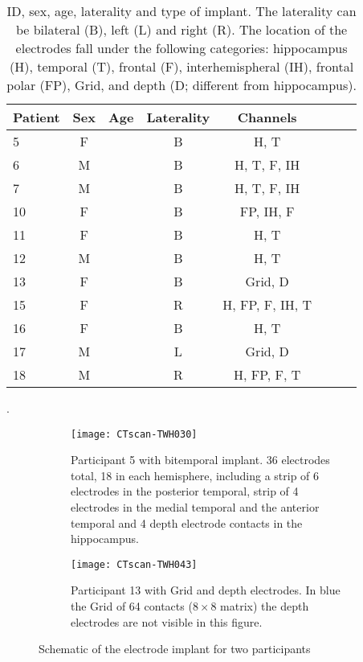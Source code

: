 \documentclass[11pt, onecolumn]{article}
\begin{document}
\begin{table}
\centering
\begin{tabular}{l*{6}{c}r}
Patient & Sex & Age & Laterality & Channels  \\
\hline
5 & F &  & B & H, T \\
6 & M &  & B & H, T, F, IH \\
7 & M &  & B & H, T, F, IH \\
10 & F &  & B & FP, IH, F  \\
11 & F &  & B & H, T \\
12 & M &  & B & H, T  \\ %
13 & F &  & B & Grid, D \\%
15 & F &  & R & H, FP, F, IH, T   \\
16 & F &  & B & H, T  \\
17 & M &  & L & Grid, D \\ %
18 & M &  & R & H, FP, F, T   \\
\end{tabular}
\caption{\label{Table:demog} ID, sex, age, laterality and type of implant. 
The laterality can be bilateral (B), left (L) and right (R). The location of the electrodes fall under the following categories: hippocampus (H), temporal (T), frontal (F),  interhemispheral (IH), frontal  polar (FP),  Grid, and depth  (D; different from hippocampus).}.
\end{table}

\begin{figure}[ht] 
  \begin{subfigure}[t]{0.5\linewidth}
    \centering
    \texttt{[image: CTscan-TWH030]} 
    \caption{Participant 5 with bitemporal implant. 36 electrodes total, 18 in each hemisphere, including a strip of 6 electrodes in the posterior temporal, strip of 4 electrodes in the medial temporal and the anterior temporal and 4 depth electrode contacts in the hippocampus.} 
    \label{fig0:a} 
    \vspace{4ex}
  \end{subfigure}%
  \hspace{1ex}
  \begin{subfigure}[t]{0.5\linewidth}
    \centering
    \texttt{[image: CTscan-TWH043]} 
    \caption{Participant 13 with Grid and depth electrodes. In blue the Grid of 64 contacts ($8 \times 8$ matrix) the depth electrodes are not visible in this figure.} 
    \label{fig0:b} 
    \vspace{4ex}
  \end{subfigure} 
  \caption{Schematic of the electrode implant for two participants}
  \label{fig0} 
\end{figure}
\end{document}
